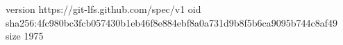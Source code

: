 version https://git-lfs.github.com/spec/v1
oid sha256:4fc980bc3fcb057430b1eb46f8e884ebf8a0a731d9b8f5b6ca9095b744c8af49
size 1975
